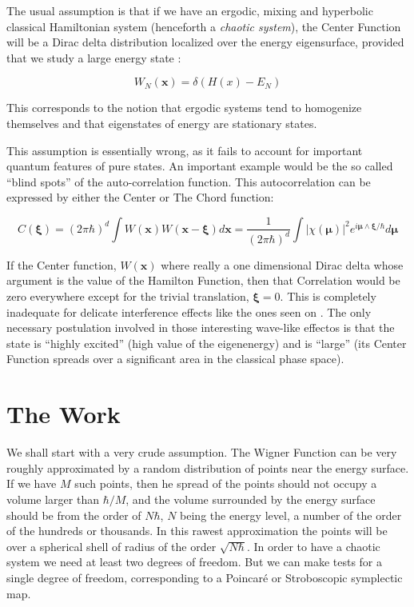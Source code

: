 \documentclass[a4paper,12pt]{article}
\newcommand{\xfase}{\mathbf{x}}
\newcommand{\xifase}{ {\boldsymbol{\xi}} }
\newcommand{\mufase}{ {\boldsymbol{\mu}} }
\begin{document}
The usual assumption is that if we have an ergodic, mixing and hyperbolic
classical Hamiltonian system (henceforth a \emph{chaotic system}), the
Center Function will be a Dirac delta distribution localized over the
energy eigensurface, provided that we study  a large 
energy state \cite{Voros76}:

\begin{equation}
W_N(\xfase)=\delta (H(x)-E_N)
\end{equation}

This corresponds to the notion that ergodic systems tend to 
homogenize themselves and that eigenstates of energy are
stationary states.

This assumption is essentially wrong, as it fails to account
for important quantum features of pure states. An important example would
be the so called ``blind spots'' \cite{Zambrano09} 
of the auto-correlation function.  This autocorrelation can be 
expressed by either the Center or The Chord function:

\begin{equation}
C(\xifase)=(2\pi\hbar)^d \int W(\xfase)W(\xfase-\xifase) d\xfase
=\frac{1}{(2\pi\hbar)^d}\int |\chi(\mufase)|^2 e^{i\mufase\wedge\xifase/\hbar}
d\mufase
\end{equation}

If the Center function, $W(\xfase)$ where really a 
one dimensional Dirac delta whose argument is
the value of the Hamilton Function, 
then that Correlation would be zero everywhere except for 
the trivial translation,  $\xifase=0$. This is completely
inadequate for delicate interference effects 
like the ones seen on \cite{Zambrano08}.
The only necessary postulation involved in those
interesting wave-like effectos  is that the
state is ``highly excited'' (high value of the eigenenergy) 
and is ``large'' (its Center Function spreads over a significant 
area in
the classical phase space).

\section{The Work}

We shall start with a very crude assumption.
 The Wigner Function can be very roughly approximated
by a random distribution of points near the energy surface. 
If we have $M$ such points, then
he spread of the points should not occupy a volume larger than
$\hbar/M$, and the volume surrounded by the energy surface
should be from the order of $N\hbar$, $N$ being 
the energy level, 
a number
of the order of the hundreds or thousands.  In this rawest
approximation the points will be over a spherical shell of
radius of the order $\sqrt{N\hbar}$. In order to have
a chaotic system we need at least two degrees of freedom.
But we can make tests for a single degree of freedom,
corresponding to a Poincaré or Stroboscopic 
symplectic map. 
\end{document}
